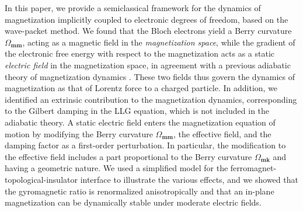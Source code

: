 \documentclass[aps,prb,twocolumn,showpacs,superscriptaddress]{revtex4-1}
\begin{document}
In this paper, we provide a semiclassical framework for the dynamics of magnetization implicitly coupled to electronic degrees of freedom, based on the wave-packet method. We found that the Bloch electrons yield a Berry curvature $\Omega_{\bm{m}\bm{m}}$, acting as a magnetic field in the \emph{magnetization space}, while the gradient of the electronic free energy with respect to the magnetization acts as a static \emph{electric field} in the magnetization space, in agreement with a previous adiabatic theory of magnetization dynamics \cite{niu:1999adiabatic}. These two fields thus govern the dynamics of magnetization as that of Lorentz force to a charged particle. In addition, we identified an extrinsic contribution to the magnetization dynamics, corresponding to the Gilbert damping in the LLG equation, which is not included in the adiabatic theory. A static electric field enters the magnetization equation of motion by modifying the Berry curvature $\Omega_{\bm{m}\bm{m}}$, the effective field, and the damping factor as a first-order perturbation. In particular, the modification to the effective field includes a part proportional to the Berry curvature $\Omega_{\bm{mk}}$ and having a geometric nature. We used a simplified model for the ferromagnet-topological-insulator interface to illustrate the various effects, and we showed that the gyromagnetic ratio is renormalized anisotropically and that an in-plane magnetization can be dynamically stable under moderate electric fields. 
\end{document}
